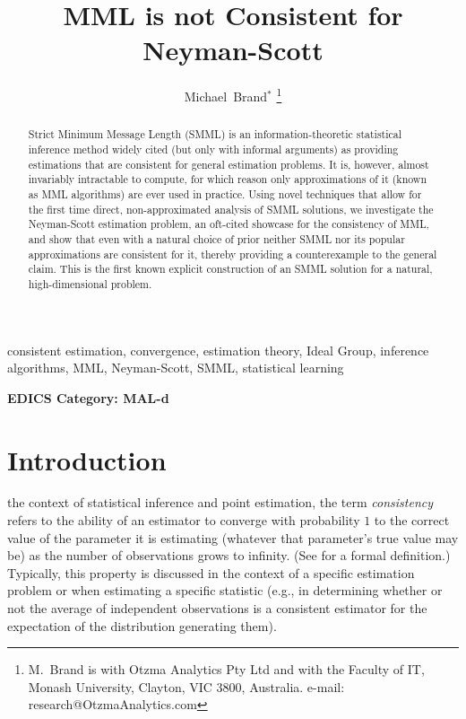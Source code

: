 \documentclass{IEEEtran}
\newcommand{\citet}[1]{\cite{#1}}
\begin{document}
\title{MML is not Consistent for Neyman-Scott}
\author{Michael~Brand$^*$%
\thanks{M.~Brand is with Otzma Analytics Pty Ltd and with the Faculty of IT, Monash University, Clayton, VIC 3800, Australia. e-mail: research@OtzmaAnalytics.com}}

\maketitle

\begin{abstract}
Strict Minimum Message Length (SMML) is an information-theoretic statistical inference method widely cited (but only with informal arguments) as providing estimations that are consistent for general estimation problems. It is, however, almost invariably intractable to compute, for which reason only approximations of it (known as MML algorithms) are ever used in practice.
Using novel techniques that allow for the first time direct, non-approximated
analysis of SMML solutions,
we investigate the Neyman-Scott estimation problem, an oft-cited showcase for the consistency of MML, and show that even with a natural choice of prior neither SMML nor its popular approximations are consistent for it, thereby providing a counterexample to the general claim. This is the first known explicit construction of an SMML solution for a natural, high-dimensional problem.
\end{abstract}

\begin{IEEEkeywords}
consistent estimation, convergence, estimation theory, Ideal Group, inference algorithms, MML, Neyman-Scott, SMML, statistical learning
\end{IEEEkeywords}

\begin{center} \bfseries EDICS Category: MAL-d \end{center}

\IEEEpeerreviewmaketitle

\section{Introduction}

 the context of statistical inference and point estimation,
the term \emph{consistency} refers to the ability of an estimator to converge
with probability $1$ to the correct value of the parameter it is estimating
(whatever that parameter's true value may be)
as the number of observations grows to infinity.
(See \citet{lehmann2006theory} for a formal definition.)
Typically, this property is discussed in the context of a specific estimation
problem or when estimating a specific statistic
(e.g., in determining whether or not the average of
independent observations is a consistent estimator for the expectation of
the distribution generating them).
\end{document}
